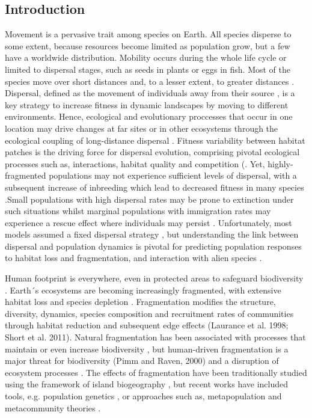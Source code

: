 \documentclass[12pt]{article}
\begin{document}
\begin{flushleft}
{{{{{\section{Introduction}
Movement is a pervasive trait among species on Earth. All species disperse to some extent, because resources become limited as population grow, but a few have a worldwide distribution. Mobility occurs during the whole life cycle or limited to dispersal stages, such as seeds in plants or eggs in fish. Most of the species move over short distances and, to a lesser extent, to greater distances \citep{davidson2004quantifying}. Dispersal, defined as the movement of individuals away from their source \citep{nathan2003methods}, is a key strategy to increase fitness in dynamic landscapes by moving to different environments. Hence, ecological and evolutionary proccesses that occur in one location may drive changes at far sites or in other ecosystems through the ecological coupling of long-distance dispersal \citep{gaines2007connecting}. Fitness variability between habitat patches is the driving force for dispersal evolution, comprising pivotal ecological processes such as, interactions, habitat quality and competition (\citep{bowler2005causes}. Yet, highly-fragmented populations may not experience sufficient levels of dispersal, with a subsequent increase of inbreeding which lead to decreased fitness in many species \citep{fath2018encyclopedia}.Small populations with high dispersal rates may be prone to extinction under such situations  whilst marginal populations with immigration rates may experience a rescue effect where individuals may persist \citep{eriksson2014emergence}. Unfortunately, most models assumed a fixed dispersal strategy \citep{mccallum2001should, levin2003ecology}, but understanding the link between dispersal and population dynamics is pivotal for predicting population responses to habitat loss and fragmentation, and interaction with alien species \citep{bowler2005causes}.

Human footprint is everywhere, even in protected areas to safeguard biodiversity \citep{ tournadre2014anthropogenic, jones2018one}. Earth´s ecosystems are becoming increasingly fragmented, with extensive habitat loss and species depletion \citep{haddad2015habitat}. Fragmentation modifies the structure, diversity, dynamics, species composition and recruitment rates of communities through habitat reduction and subsequent edge effects (Laurance et al. 1998; Short et al. 2011). Natural fragmentation has been associated with processes that maintain or even increase biodiversity \citep{tilman1988plant}, but human-driven fragmentation is a major threat for biodiversity (Pimm and Raven, 2000) and a disruption of ecosystem processes \citep{achard2002determination}. The effects of fragmentation have been traditionally studied using the framework of island biogeography \citep{whittaker2007island}, but recent works have included tools, e.g. population genetics \citep{young1996population}, or approaches such as, metapopulation \citep{hanski2004ecology} and metacommunity theories \citep{mouquet2011extinction}.

}}}}}
\end{flushleft}
\end{document}

